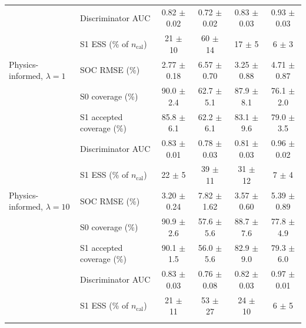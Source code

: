 \begin{tabular}{llcccc}
 & Discriminator AUC & 0.82 $\pm$ 0.02 & 0.72 $\pm$ 0.02 & 0.83 $\pm$ 0.03 & 0.93 $\pm$ 0.03 \\
 & S1 ESS (\% of $n_{\mathrm{cal}}$) & 21 $\pm$ 10 & 60 $\pm$ 14 & 17 $\pm$ 5 & 6 $\pm$ 3 \\
\addlinespace
Physics-informed, $\lambda = 1$ & SOC RMSE (\%) & 2.77 $\pm$ 0.18 & 6.57 $\pm$ 0.70 & 3.25 $\pm$ 0.88 & 4.71 $\pm$ 0.87 \\
 & S0 coverage (\%) & 90.0 $\pm$ 2.4 & 62.7 $\pm$ 5.1 & 87.9 $\pm$ 8.1 & 76.1 $\pm$ 2.0 \\
 & S1 accepted coverage (\%) & 85.8 $\pm$ 6.1 & 62.2 $\pm$ 6.1 & 83.1 $\pm$ 9.6 & 79.0 $\pm$ 3.5 \\
 & Discriminator AUC & 0.83 $\pm$ 0.01 & 0.78 $\pm$ 0.03 & 0.81 $\pm$ 0.03 & 0.96 $\pm$ 0.02 \\
 & S1 ESS (\% of $n_{\mathrm{cal}}$) & 22 $\pm$ 5 & 39 $\pm$ 11 & 31 $\pm$ 12 & 7 $\pm$ 4 \\
\addlinespace
Physics-informed, $\lambda = 10$ & SOC RMSE (\%) & 3.20 $\pm$ 0.24 & 7.82 $\pm$ 1.62 & 3.57 $\pm$ 0.60 & 5.39 $\pm$ 0.89 \\
 & S0 coverage (\%) & 90.9 $\pm$ 2.6 & 57.6 $\pm$ 5.6 & 88.7 $\pm$ 7.6 & 77.8 $\pm$ 4.9 \\
 & S1 accepted coverage (\%) & 90.1 $\pm$ 1.5 & 56.0 $\pm$ 5.6 & 82.9 $\pm$ 9.0 & 79.3 $\pm$ 6.0 \\
 & Discriminator AUC & 0.83 $\pm$ 0.03 & 0.76 $\pm$ 0.08 & 0.82 $\pm$ 0.03 & 0.97 $\pm$ 0.01 \\
 & S1 ESS (\% of $n_{\mathrm{cal}}$) & 21 $\pm$ 11 & 53 $\pm$ 27 & 24 $\pm$ 10 & 6 $\pm$ 5 \\
\addlinespace
\bottomrule
\end{tabular}
